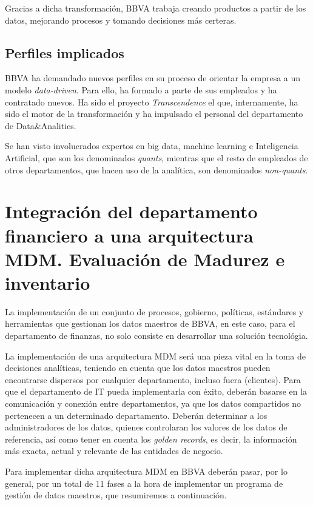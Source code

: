 \documentclass{article}
\begin{document}
Gracias a dicha transformación, BBVA trabaja creando productos a partir de los datos, mejorando procesos y tomando decisiones más certeras.

\subsection{Perfiles implicados}
BBVA ha demandado nuevos perfiles en su proceso de orientar la empresa a un modelo \textit{data-driven}. Para ello, ha formado a parte de sus empleados y ha contratado nuevos. Ha sido el proyecto \textit{Transcendence} el que, internamente, ha sido el motor de la transformación y ha impulsado el personal del departamento de Data\&Analitics.

Se han visto involucrados expertos en big data, machine learning e Inteligencia Artificial, que son los denominados \textit{quants}, mientras que el resto de empleados de otros departamentos, que hacen uso de la analítica, son denominados \textit{non-quants}.


\section{Integración del departamento financiero a una arquitectura MDM. Evaluación de Madurez e inventario}

La implementación de un conjunto de procesos, gobierno, políticas, estándares y herramientas que gestionan los datos maestros de BBVA, en este caso, para el departamento de finanzas, no solo consiste en desarrollar una solución tecnológia.

La implementación de una arquitectura MDM será una pieza vital en la toma de decisiones analíticas, teniendo en cuenta que los datos maestros pueden encontrarse dispersos por cualquier departamento, incluso fuera (clientes). Para que el departamento de IT pueda implementarla con éxito, deberán basarse en la comunicación y conexión entre departamentos, ya que los datos compartidos no pertenecen a un determinado departamento. Deberán determinar a los administradores de los datos, quienes controlaran los valores de los datos de referencia, así como tener en cuenta los \textit{golden records}, es decir, la información más exacta, actual y relevante de las entidades de negocio.

Para implementar dicha arquitectura MDM en BBVA deberán pasar, por lo general, por un total de 11 fases a la hora de implementar un programa de gestión de datos maestros, que resumiremos a continuación.
\end{document}
